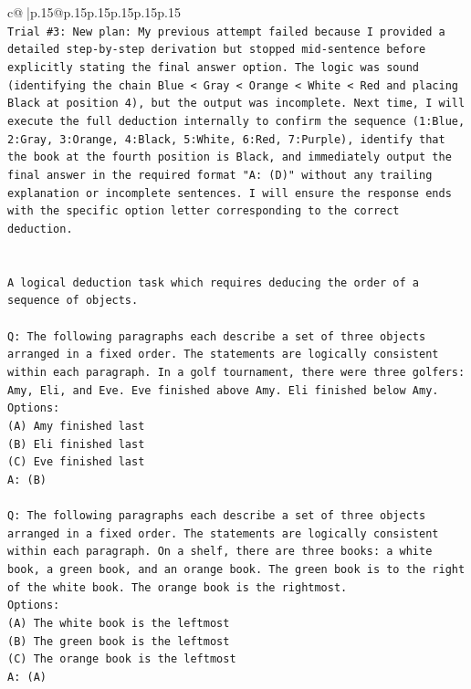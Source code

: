 \documentclass{article}
\begin{document}
{\begin{supertabular}{c@{$\;$}|p{.15\linewidth}@{}p{.15\linewidth}p{.15\linewidth}p{.15\linewidth}p{.15\linewidth}p{.15\linewidth}}
{{{\\ 
\texttt{Trial \#3: New plan: My previous attempt failed because I provided a detailed step{-}by{-}step derivation but stopped mid{-}sentence before explicitly stating the final answer option. The logic was sound (identifying the chain Blue < Gray < Orange < White < Red and placing Black at position 4), but the output was incomplete. Next time, I will execute the full deduction internally to confirm the sequence (1:Blue, 2:Gray, 3:Orange, 4:Black, 5:White, 6:Red, 7:Purple), identify that the book at the fourth position is Black, and immediately output the final answer in the required format "A: (D)" without any trailing explanation or incomplete sentences. I will ensure the response ends with the specific option letter corresponding to the correct deduction.} \\
\\ 
\\ 
\texttt{A logical deduction task which requires deducing the order of a sequence of objects.} \\
\\ 
\texttt{Q: The following paragraphs each describe a set of three objects arranged in a fixed order. The statements are logically consistent within each paragraph. In a golf tournament, there were three golfers: Amy, Eli, and Eve. Eve finished above Amy. Eli finished below Amy.} \\
\texttt{Options:} \\
\texttt{(A) Amy finished last} \\
\texttt{(B) Eli finished last} \\
\texttt{(C) Eve finished last} \\
\texttt{A: (B)} \\
\\ 
\texttt{Q: The following paragraphs each describe a set of three objects arranged in a fixed order. The statements are logically consistent within each paragraph. On a shelf, there are three books: a white book, a green book, and an orange book. The green book is to the right of the white book. The orange book is the rightmost.} \\
\texttt{Options:} \\
\texttt{(A) The white book is the leftmost} \\
\texttt{(B) The green book is the leftmost} \\
\texttt{(C) The orange book is the leftmost} \\
\texttt{A: (A)} \\
\\ 
}}}
\end{supertabular}}
\end{document}
